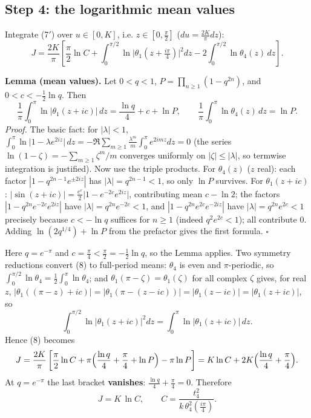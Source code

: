 \documentclass[11pt]{article}
\theoremstyle{remark}
\begin{document}
\subsection*{Step 4: the logarithmic mean values}

Integrate (7$'$) over $u\in[0,K]$, i.e. $z\in[0,\tfrac\pi2]$ ($du=\tfrac{2K}\pi dz$):
\begin{equation*}
J=\frac{2K}{\pi}\left[\frac\pi2\ln C+\int_0^{\pi/2}\ln\bigl|\theta_1(z+\tfrac{i\pi}4)\bigr|^2dz-2\int_0^{\pi/2}\ln\theta_4(z)\,dz\right]. \tag{8}
\end{equation*}

\textbf{Lemma (mean values).} Let $0<q<1$, $P=\prod_{n\ge1}(1-q^{2n})$, and $0<c<-\tfrac12\ln q$. Then
\begin{equation*}
\frac1\pi\int_0^{\pi}\ln\bigl|\theta_1(z+ic)\bigr|\,dz=\frac{\ln q}{4}+c+\ln P,\qquad
\frac1\pi\int_0^{\pi}\ln\theta_4(z)\,dz=\ln P. \tag{9}
\end{equation*}
\textit{Proof.} The basic fact: for $|\lambda|<1$,
$\int_0^{\pi}\ln\bigl|1-\lambda e^{2iz}\bigr|\,dz=-\Re\sum_{m\ge1}\frac{\lambda^m}{m}\int_0^\pi e^{2imz}dz=0$
(the series $\ln(1-\zeta)=-\sum_{m\ge1}\zeta^m/m$ converges uniformly on $|\zeta|\le|\lambda|$, so termwise integration is justified). Now use the triple products. For $\theta_4(z)$ ($z$ real): each factor $|1-q^{2n-1}e^{\pm2iz}|$ has $|\lambda|=q^{2n-1}<1$, so only $\ln P$ survives. For $\theta_1(z+ic)$: $|\sin(z+ic)|=\tfrac{e^{c}}2\bigl|1-e^{-2c}e^{2iz}\bigr|$, contributing mean $c-\ln2$; the factors $|1-q^{2n}e^{-2c}e^{2iz}|$ have $|\lambda|=q^{2n}e^{-2c}<1$, and $|1-q^{2n}e^{2c}e^{-2iz}|$ have $|\lambda|=q^{2n}e^{2c}<1$ precisely because $c<-\ln q$ suffices for $n\ge1$ (indeed $q^2e^{2c}<1$); all contribute $0$. Adding $\ln(2q^{1/4})+\ln P$ from the prefactor gives the first formula. $\square$

Here $q=e^{-\pi}$ and $c=\tfrac\pi4<\tfrac\pi2=-\tfrac12\ln q$, so the Lemma applies. Two symmetry reductions convert (8) to full-period means: $\theta_4$ is even and $\pi$-periodic, so $\int_0^{\pi/2}\ln\theta_4=\tfrac12\int_0^{\pi}\ln\theta_4$; and $\theta_1(\pi-\zeta)=\theta_1(\zeta)$ for all complex $\zeta$ gives, for real $z$, $\bigl|\theta_1((\pi-z)+ic)\bigr|=\bigl|\theta_1(\pi-(z-ic))\bigr|=\bigl|\theta_1(z-ic)\bigr|=\bigl|\theta_1(z+ic)\bigr|$, so
\[\int_0^{\pi/2}\ln\bigl|\theta_1(z+ic)\bigr|^2dz=\int_0^{\pi}\ln\bigl|\theta_1(z+ic)\bigr|\,dz .\]
Hence (8) becomes
\[J=\frac{2K}\pi\left[\frac{\pi}{2}\ln C+\pi\Bigl(\frac{\ln q}{4}+\frac{\pi}{4}+\ln P\Bigr)-\pi\ln P\right]
=K\ln C+2K\Bigl(\frac{\ln q}{4}+\frac\pi4\Bigr).\]
At $q=e^{-\pi}$ the last bracket \textbf{vanishes}: $\tfrac{\ln q}4+\tfrac\pi4=0$. Therefore
\begin{equation*}
J=K\,\ln C,\qquad C=\frac{t_4^2}{k\,\theta_4^2\!\left(\tfrac{i\pi}{4}\right)} . \tag{10}
\end{equation*}
\end{document}
